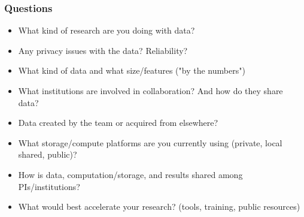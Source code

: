 \begin{frame}
\frametitle{Questions}

\begin{itemize}
\item What kind of research are you doing with data?
\item Any privacy issues with the data? Reliability?
\item What kind of data and what size/features ("by the numbers")
\item What institutions are involved in collaboration? And how do they share data?
\item Data created by the team or acquired from elsewhere?
\item What storage/compute platforms are you currently using (private, local shared, public)?
\item How is data, computation/storage, and results shared among PIs/institutions?
\item What would best accelerate your research? (tools, training, public resources)
\end{itemize}

\end{frame}


